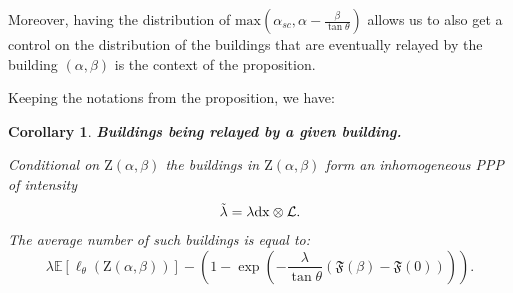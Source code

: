 \documentclass[10pt,english,a4paper]{smfart}
\newtheorem{corollary}{Corollary}[section]
\theoremstyle{definition}
\theoremstyle{remark}
\newcommand{\primi}{\mathfrak{F}}
\newcommand{\zone}{\mathrm{Z}}
\newcommand{\e}{\mathbb{E}}
\renewcommand{\max}{\text{max}}
\begin{document}
Moreover, having the distribution of $\max(\alpha_{sc},\alpha-\frac{\beta}{\tan\theta})$ allows us to also get a control on the distribution of the buildings that are eventually relayed by the building $(\alpha, \beta)$ is the context of the proposition.

Keeping the notations from the proposition, we have:

\begin{corollary}\textbf{Buildings being relayed by a given building.}\label{desc_build}
    
Conditional on $\zone(\alpha, \beta)$ the buildings in $\zone(\alpha, \beta)$ form an inhomogeneous PPP of intensity
\[\tilde{\lambda} = \lambda \rm{d}x\otimes \mathcal{L}. \]
The average number of such buildings is equal to:
\[\lambda\e[\ell_\theta(\zone(\alpha, \beta))] - \left(1-\exp(-\frac{\lambda}{\tan\theta}(\primi(\beta)-\primi(0)))\right).\]
\end{corollary}
\end{document}
